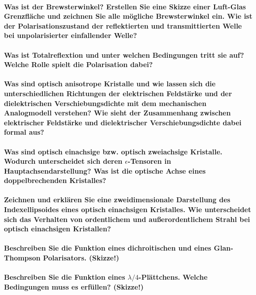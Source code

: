 \documentclass[a4paper, 11pt, parskip=half]{scrartcl}
\begin{document}
\paragraph{Was ist der Brewsterwinkel? Erstellen Sie eine Skizze einer Luft-Glas Grenzfläche und
zeichnen Sie alle mögliche Brewsterwinkel ein. Wie ist der Polarisationszustand der reflektierten
und transmittierten Welle bei unpolarisierter einfallender Welle?}

\paragraph{Was ist Totalreflextion und unter welchen Bedingungen tritt sie auf? Welche Rolle spielt
die Polarisation dabei?}

\paragraph{Was sind optisch anisotrope Kristalle und wie lassen sich die unterschiedlichen
Richtungen der elektrischen Feldstärke und der dielektrischen Verschiebungsdichte mit dem
mechanischen Analogmodell verstehen? Wie sieht der Zusammenhang zwischen elektrischer Feldstärke und dielektrischer Verschiebungsdichte dabei formal aus?}

\paragraph{Was sind optisch einachsige bzw. optisch zweiachsige Kristalle. Wodurch unterscheidet
sich deren $\epsilon$-Tensoren in Hauptachsendarstellung? Was ist die optische Achse eines
doppelbrechenden Kristalles?}

\paragraph{Zeichnen und erklären Sie eine zweidimensionale Darstellung des Indexellipsoides eines
optisch einachsigen Kristalles. Wie unterscheidet sich das Verhalten von ordentlichem und
außerordentlichem Strahl bei optisch einachsigen Kristallen?}

\paragraph{Beschreiben Sie die Funktion eines dichroitischen und eines Glan-Thompson Polarisators.
(Skizze!)}

\paragraph{Beschreiben Sie die Funktion eines $\lambda/4$-Plättchens. Welche Bedingungen muss es
erfüllen? (Skizze!)}
\end{document}
